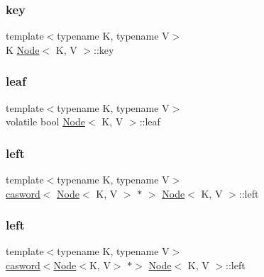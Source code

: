 \subsubsection{\texorpdfstring{key}{key}\hspace{0.1cm}{\footnotesize\ttfamily [3/3]}}
{\footnotesize\ttfamily template$<$typename K, typename V$>$ \\
K \hyperlink{classNode}{Node}$<$ K, V $>$\+::key}

\mbox{\label{classNode_a1897c0740278b98f1066d2f62f29e6f4}} 
\subsubsection{\texorpdfstring{leaf}{leaf}}
{\footnotesize\ttfamily template$<$typename K, typename V$>$ \\
volatile bool \hyperlink{classNode}{Node}$<$ K, V $>$\+::leaf}

\mbox{\label{classNode_a13ed6bdab297ee3dc66ca598f51fdbb5}} 
\subsubsection{\texorpdfstring{left}{left}\hspace{0.1cm}{\footnotesize\ttfamily [1/2]}}
{\footnotesize\ttfamily template$<$typename K, typename V$>$ \\
\hyperlink{structcasword}{casword}$<$ \hyperlink{classNode}{Node}$<$ K, V $>$ $\ast$ $>$ \hyperlink{classNode}{Node}$<$ K, V $>$\+::left}

\mbox{\label{classNode_ad94b2acd7430ef8a2ef4a197f4466c64}} 
\subsubsection{\texorpdfstring{left}{left}\hspace{0.1cm}{\footnotesize\ttfamily [2/2]}}
{\footnotesize\ttfamily template$<$typename K, typename V$>$ \\
\hyperlink{structcasword}{casword}$<$\hyperlink{classNode}{Node}$<$K, V$>$ $\ast$$>$ \hyperlink{classNode}{Node}$<$ K, V $>$\+::left}

\mbox{\label{classNode_ad1ad570bba87cab1d79d419129173e90}} 
